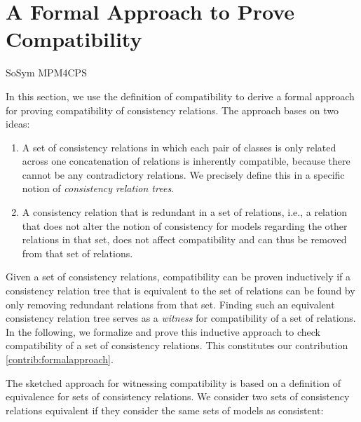 \section{A Formal Approach to Prove Compatibility}
\label{chap:formal:approach}

\begin{copiedFrom}{SoSym MPM4CPS}

In this section, we use the definition of compatibility to derive a formal approach for proving compatibility of consistency relations.
The approach bases on two ideas:
\begin{enumerate}
    \item A set of consistency relations in which each pair of classes is only related across one concatenation of relations is inherently compatible, because there cannot be any contradictory relations. We precisely define this in a specific notion of \emph{consistency relation trees}.
    \item A consistency relation that is redundant in a set of relations, i.e., a relation that does not alter the notion of consistency for models regarding the other relations in that set, does not affect compatibility and can thus be removed from that set of relations. %
\end{enumerate}
Given a set of consistency relations, compatibility can be proven inductively if a consistency relation tree that is equivalent to the set of relations can be found by only removing redundant relations from that set.
Finding such an equivalent consistency relation tree serves as a \emph{witness} for compatibility of a set of relations.
In the following, we formalize and prove this inductive approach to check compatibility of a set of consistency relations.
This constitutes our contribution \ref{contrib:formalapproach}.

The sketched approach for witnessing compatibility is based on a definition of equivalence for sets of consistency relations.
We consider two sets of consistency relations equivalent if they consider the same sets of models as consistent:


\end{copiedFrom}

